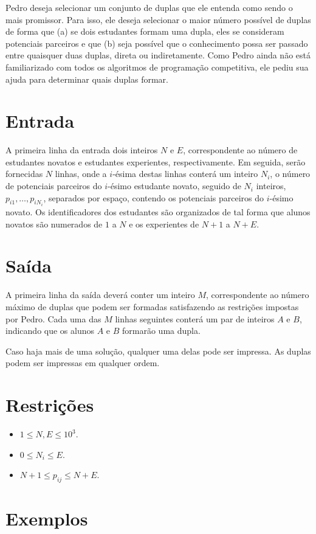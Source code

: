 Pedro deseja selecionar um conjunto de duplas que ele entenda como sendo o mais promissor. Para isso, ele deseja selecionar o maior número possível
de duplas de forma que (a) se dois estudantes formam uma dupla, eles se consideram potenciais parceiros e que (b) seja possível que o conhecimento
possa ser passado entre quaisquer duas duplas, direta ou indiretamente. Como Pedro ainda não está familiarizado com todos os algoritmos de programação
competitiva, ele pediu sua ajuda para determinar quais duplas formar.



\section*{Entrada}

A primeira linha da entrada dois inteiros $N$ e $E$, correspondente ao número de estudantes novatos e estudantes experientes, respectivamente.
Em seguida, serão fornecidas $N$ linhas, onde a $i$-ésima destas linhas conterá um inteiro $N_i$, o número de potenciais parceiros do $i$-ésimo
estudante novato, seguido de $N_i$ inteiros, $p_{i1}, \ldots, p_{iN_i}$, separados por espaço, contendo os potenciais parceiros do $i$-ésimo novato.
Os identificadores dos estudantes são organizados de tal forma que alunos novatos são numerados de $1$ a $N$ e os experientes de $N + 1$ a $N + E$.


\section*{Saída}

A primeira linha da saída deverá conter um inteiro $M$, correspondente ao número máximo de duplas que podem ser formadas satisfazendo as restrições
impostas por Pedro. Cada uma das $M$ linhas seguintes conterá um par de inteiros $A$ e $B$, indicando que os alunos $A$ e $B$ formarão uma dupla. 

Caso haja mais de uma solução, qualquer uma delas pode ser impressa. As duplas podem ser impressas em qualquer ordem. 

\section*{Restrições}

\begin{itemize}
    \item $1 \leq N,E \leq 10^{3}$.
    \item $0 \leq N_i \leq E$.
    \item $N+1 \leq p_{ij} \leq N+E$.
\end{itemize}


\section*{Exemplos}

\exemplo
